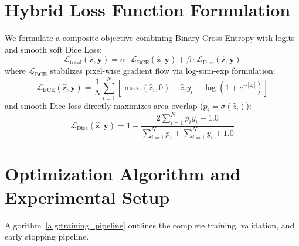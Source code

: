 \documentclass[10pt,a4paper]{report}
\begin{document}
\section{Hybrid Loss Function Formulation}
We formulate a composite objective combining Binary Cross-Entropy with logits and smooth soft Dice Loss:
\begin{equation}
\mathcal{L}_{\text{total}}(\hat{\mathbf{z}}, \mathbf{y}) = \alpha \cdot \mathcal{L}_{\text{BCE}}(\hat{\mathbf{z}}, \mathbf{y}) + \beta \cdot \mathcal{L}_{\text{Dice}}(\hat{\mathbf{z}}, \mathbf{y})
\end{equation}
where $\mathcal{L}_{\text{BCE}}$ stabilizes pixel-wise gradient flow via log-sum-exp formulation:
\begin{equation}
\mathcal{L}_{\text{BCE}}(\hat{\mathbf{z}}, \mathbf{y}) = \frac{1}{N} \sum_{i=1}^{N} \left[ \max(\hat{z}_i, 0) - \hat{z}_i y_i + \log\left(1 + e^{-|\hat{z}_i|}\right) \right]
\end{equation}
and smooth Dice loss directly maximizes area overlap ($p_i = \sigma(\hat{z}_i)$):
\begin{equation}
\mathcal{L}_{\text{Dice}}(\hat{\mathbf{z}}, \mathbf{y}) = 1 - \frac{2 \sum_{i=1}^N p_i y_i + 1.0}{\sum_{i=1}^N p_i + \sum_{i=1}^N y_i + 1.0}
\end{equation}

\section{Optimization Algorithm and Experimental Setup}
Algorithm~\ref{alg:training_pipeline} outlines the complete training, validation, and early stopping pipeline.
\end{document}

